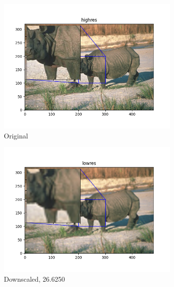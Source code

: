 \documentclass[12pt]{article}
\begin{document}
\begin{figure}[h!]
  \begin{subfigure}[b]{0.32\linewidth}
    \includegraphics[width=\linewidth]{./3-highres.png}
    \caption{Original}
  \end{subfigure}
  \hfill
  \begin{subfigure}[b]{0.32\linewidth}
    \includegraphics[width=\linewidth]{./3-lowres.png}
    \caption{Downscaled, 26.6250}
  \end{subfigure}
  \hfill
  \begin{subfigure}[b]{0.32\linewidth}

\end{subfigure}
\end{figure}
\end{document}
